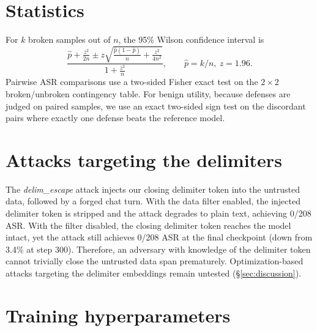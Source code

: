 \documentclass{article}
\begin{document}
\begin{table}[h]
  \caption{Effect of the data filter (off vs.\ on) on AlpacaFarm any-attack ASR (\%) with 95\% Wilson intervals. With the filter \emph{off}, untrusted data is passed verbatim to the model; with it \emph{on}, Llama-3's eight control tokens (and, for our defense, our two delimiter tokens) are stripped.}
  \label{tab:filter}
  \centering
  \small
  
\end{table}

\section{Statistics}
\label{app:stats}

For $k$ broken samples out of $n$, the 95\% Wilson confidence interval is
\begin{equation}
  \frac{\hat p + \frac{z^2}{2n} \pm z\sqrt{\frac{\hat p(1-\hat p)}{n} + \frac{z^2}{4n^2}}}{1 + \frac{z^2}{n}},
  \qquad \hat p = k/n,\ z = 1.96 .
\end{equation}
Pairwise ASR comparisons use a two-sided Fisher exact test on the $2 \times 2$ broken/unbroken contingency table. For benign utility, because defenses are judged on paired samples, we use an exact two-sided sign test on the discordant pairs where exactly one defense beats the reference model.

\section{Attacks targeting the delimiters}
\label{app:escape}

The \emph{delim\_escape} attack injects our closing delimiter token into the untrusted data, followed by a forged chat turn. With the data filter enabled, the injected delimiter token is stripped and the attack degrades to plain text, achieving 0/208 ASR. With the filter disabled, the closing delimiter token reaches the model intact, yet the attack still achieves 0/208 ASR at the final checkpoint (down from 3.4\% at step 300). Therefore, an adversary with knowledge of the delimiter token cannot trivially close the untrusted data span prematurely. Optimization-based attacks targeting the delimiter embeddings remain untested (\S\ref{sec:discussion}).

\section{Training hyperparameters}
\label{app:hparams}
\end{document}
